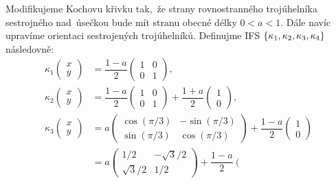 \begin{example}\label{ex:modifikovana-kochova-krivka}
    Modifikujeme Kochovu křivku tak,~že strany rovnostranného trojúhelníka sestrojného nad~úsečkou bude mít stranu obecné délky $0<a<1$. Dále navíc upravíme orientaci sestrojených trojúhelníků. Definujme IFS $\left\{\kappa_1,\kappa_2,\kappa_3,\kappa_4\right\}$ následovně:
    \begin{align*}
        \kappa_1\left(\begin{matrix}
            x\\
            y
        \end{matrix}\right)&=\dfrac{1-a}{2}\left(\begin{matrix}
            1 & 0\\
            0 & 1
        \end{matrix}\right),\\
        \kappa_2\left(\begin{matrix}
            x\\
            y
        \end{matrix}\right)&=\dfrac{1-a}{2}\left(\begin{matrix}
            1 & 0\\
            0 & 1
        \end{matrix}\right)+\dfrac{1+a}{2}\left(\begin{matrix}
            1\\
            0
        \end{matrix}\right),\\
        \kappa_3\left(\begin{matrix}
            x\\
            y
        \end{matrix}\right)&=a\left(\begin{matrix}
            \cos(\pi/3) & -\sin(\pi/3)\\
            \sin(\pi/3) & \cos(\pi/3)
        \end{matrix}\right)+\dfrac{1-a}{2}\left(\begin{matrix}
            1\\
            0
        \end{matrix}\right)\\
        &=a\left(\begin{matrix}
            1/2 & -\sqrt{3}/2\\
            \sqrt{3}/2 & 1/2
        \end{matrix}\right)+\dfrac{1-a}{2}\left(\begin{matrix}

\end{matrix}
\end{align*}
\end{example}

